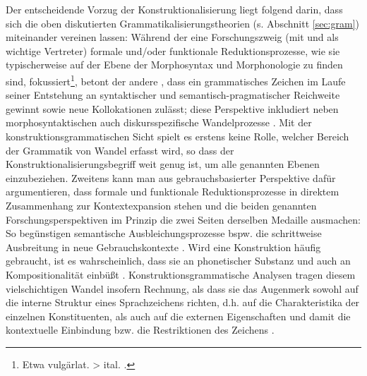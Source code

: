 Der entscheidende Vorzug der Konstruktionalisierung liegt \textcite[60--62]{Traugott2015} folgend darin, dass sich die oben diskutierten Grammatikalisierungstheorien (s. Abschnitt \ref{sec:gram}) miteinander vereinen lassen: Während der eine Forschungszweig (mit \cite{Lehmann1995} und \cite{Haspelmath2004} als wichtige Vertreter) formale und/oder funktionale Reduktionsprozesse, wie sie typischerweise auf der Ebene der Morphosyntax und Morphonologie zu finden sind, fokussiert\footnote{Etwa vulgärlat.   > ital.   \parencite[1254]{Lehmann1995}.}, betont der andere \parencite[vertreten u.a. durch][]{Himmelmann2004,Croft2006}, dass ein grammatisches Zeichen im Laufe seiner Entstehung an syntaktischer und semantisch-pragmatischer Reichweite gewinnt sowie neue Kollokationen zulässt; diese Perspektive inkludiert neben morphosyntaktischen auch diskursspezifische Wandelprozesse \parencite[vgl. den Begriff der  für die Entwicklung von Diskursmarkern bei][]{Auer2005}. Mit der konstruktionsgrammatischen Sicht spielt es erstens keine Rolle, welcher Bereich der Grammatik von Wandel erfasst wird, so dass der Konstruktionalisierungsbegriff weit genug ist, um alle genannten Ebenen einzubeziehen. Zweitens kann man aus gebrauchsbasierter Perspektive dafür argumentieren, dass formale und funktionale Reduktionsprozesse in direktem Zusammenhang zur Kontextexpansion stehen und die beiden genannten Forschungsperspektiven im Prinzip die zwei Seiten derselben Medaille ausmachen: So begünstigen semantische Ausbleichungsprozesse bspw. die schrittweise Ausbreitung in neue Gebrauchskontexte \parencite[61]{Traugott2015}. Wird eine Konstruktion häufig gebraucht, ist es wahrscheinlich, dass sie an phonetischer Substanz und auch an Kompositionalität einbüßt \parencite[20]{Bybee2010}.  Konstruktionsgrammatische Analysen tragen diesem vielschichtigen Wandel insofern Rechnung, als dass sie das Augenmerk sowohl auf die interne Struktur eines Sprachzeichens richten, d.h. auf die Charakteristika der einzelnen Konstituenten, als auch auf die externen Eigenschaften und damit die kontextuelle Einbindung bzw. die Restriktionen des Zeichens  \parencite[zu diesem externen/internen Kontrast s. weiterführend][]{Fried2013}.  

